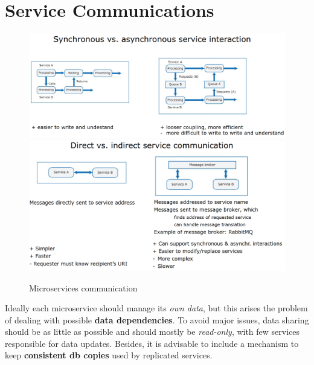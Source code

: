 \section{Service Communications}
\begin{figure}[htbp]
   \centering
   \includegraphics{images/microservices_communications1.png}\\
   \includegraphics{images/microservices_communications2.png}
   \caption{Microservices communication}
   \label{fig:microservices_communications}
\end{figure}


Ideally each microservice should manage its \textit{own data}, but this arises the problem of dealing with possible \textbf{data dependencies}.\nl
To avoid major issues, data sharing should be as little as possible
and should mostly be \textit{read-only}, with few services responsible for data updates.
Besides, it is advisable to include a mechanism to keep \textbf{consistent db copies} used by replicated services.

